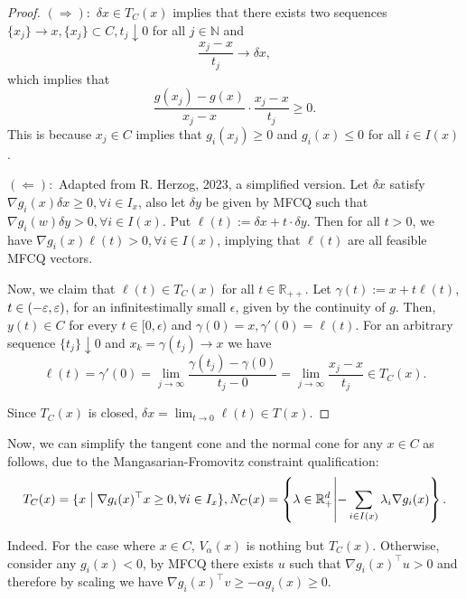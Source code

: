 \documentclass[10pt,a4paper]{article}
\begin{document}
\begin{proof}
     $(\Rightarrow):$ $\delta x\in T_C(x)$ implies that there exists two sequences $\{x_j\}\rightarrow x, \{x_j\}\subset C, t_j\downarrow 0$ for all $j\in \mathbb{N}$ and $$\frac{x_j-x}{t_j}\rightarrow \delta x,$$ which implies that $$\frac{g(x_j)-g(x)}{x_j-x}\cdot\frac{x_j-x}{t_j}\geq 0.$$ This is because $x_j\in C$ implies that $g_i(x_j)\geq 0$ and $g_i(x)\leq 0$ for all $i\in I(x)$.

     $(\Leftarrow):$ Adapted from R. Herzog, 2023, a simplified version. Let $\delta x$ satisfy $\nabla g_i(x)\delta x\geq 0, \forall i\in I_x$, also let $\delta y$ be given by MFCQ such that $\nabla g_i(w)\delta y>0, \forall i \in I(x)$. Put $\ell(t):=\delta x+ t\cdot\delta y$. Then for all $t>0$, we have $\nabla g_i(x) \ell(t)>0, \forall i\in I(x)$, implying that $\ell(t)$ are all feasible MFCQ vectors.

     Now, we claim that $\ell(t)\in T_C(x)$ for all $t\in \mathbb{R}_{++}$. Let $\gamma(t):=x+t\ell(t)$, $t\in(-\varepsilon, \varepsilon)$, for an infinitestimally small $\epsilon$, given by the continuity of $g$. Then, $y(t)\in C$ for every $t\in [0, \epsilon)$ and $\gamma(0)=x, \gamma'(0)=\ell(t)$. For an arbitrary sequence $\{t_j\}\downarrow0$ and $x_k = \gamma(t_j)\rightarrow x$ we have $$\ell(t)=\gamma'(0)=\lim_{j\to\infty} \frac{\gamma(t_j)-\gamma(0)}{t_j-0}=\lim_{j\to\infty}\frac{x_j-x}{t_j}\in T_C(x).$$

     Since $T_C(x)$ is closed, $\delta x=\lim_{t\to0}\ell(t)\in T(x)$.
\end{proof}

Now, we can simplify the tangent cone and the normal cone for any $x\in C$ as follows, due to the Mangasarian-Fromovitz constraint qualification: $$T_C(x)=\{x\bigm|\nabla g_i(x)^{\top} x\geq 0, \forall i \in I_x\}, N_C(x)=\left\{\lambda\in \mathbb{R}^d_{+}\middle|-\sum_{i\in I(x)} \lambda_i \nabla g_i(x)\right\}.$$


Indeed. For the case where $x\in C$, $V_\alpha(x)$ is nothing but $T_C(x)$. Otherwise, consider any $g_i(x)<0$, by MFCQ there exists $u$ such that $\nabla g_i(x)^{\top} u> 0$ and therefore by scaling we have $\nabla g_i(x)^\top v\geq -\alpha g_i(x)\geq 0$.
\end{document}
